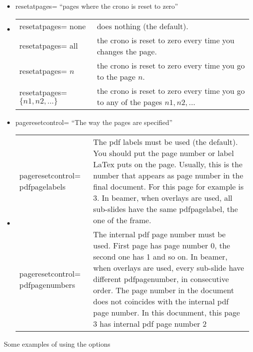\documentclass{article}
\begin{document}
\begin{itemize}
\item  resetatpages= ``pages where the crono is reset to zero''
\item[]
\begin{tabular}{lp{6.5cm}}
resetatpages= none  & does nothing  (the default). \\
resetatpages= all   & the crono is reset to zero every time you changes the page. \\
resetatpages= $n$   & the crono is reset to zero every time you go to the page $n$. \\
resetatpages= $\{n1, n2, \ldots \}$  & the crono is reset to zero every time you go to any of the pages $n1, n2, \ldots$
\end{tabular}
\item  pageresetcontrol= ``The way the pages are specified''
\item[]
\begin{tabular}{lp{6.5cm}}
pageresetcontrol= pdfpagelabels  & The pdf labels must be used (the default). You should put the page number or label LaTex puts on the page. 
Usually, this is the number that appears as page number in the final document.  For this page for example is 3.
In beamer, when overlays are used, all sub-slides have the same pdfpagelabel, the one of the frame.\\
pageresetcontrol= pdfpagenumbers   & The internal pdf page number must be used.  First page has page number 0, the second one has 1 and so on. 
In beamer, when overlays are used, every sub-slide have different pdfpagenumber, in consecutive order.  The page number in the document does not 
coincides with the internal pdf page number.  In this docunment, this page 3 has internal pdf page number 2\\
\end{tabular}
\end{itemize}

Some examples of using the options
\end{document}
